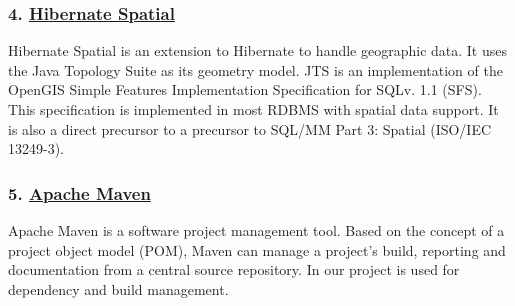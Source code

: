 \subsubsection{4.
\href{http://www.hibernatespatial.org/}{\textbf{Hibernate
Spatial}}}\label{hibernate-spatial}

Hibernate Spatial is an extension to Hibernate to handle geographic
data. It uses the Java Topology Suite as its geometry model. JTS is an
implementation of the OpenGIS Simple Features Implementation
Specification for SQLv. 1.1 (SFS). This specification is implemented in
most RDBMS with spatial data support. It is also a direct precursor to a
precursor to SQL/MM Part 3: Spatial (ISO/IEC 13249-3).

\subsubsection{5. \href{http://maven.apache.org/}{\textbf{Apache
Maven}}}\label{apache-maven}

Apache Maven is a software project management tool. Based on the concept
of a project object model (POM), Maven can manage a project's build,
reporting and documentation from a central source repository. In our
project is used for dependency and build management.